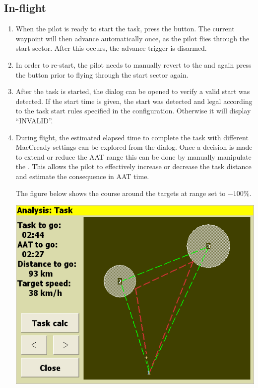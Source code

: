 \documentclass[a4paper,12pt]{refrep}
\begin{document}
\subsection*{In-flight}
\begin{enumerate}
\item  When the pilot is ready to start the task, press the  button.  The current waypoint will then advance automatically
once, as the pilot flies through the start sector.  After this occurs, the advance trigger is disarmed.  
\item  In order to re-start, the pilot needs to manually revert to the
 and again press the  button prior to
flying through the start sector again.
\item  After the task is started, the  dialog can be opened to
verify a valid start was detected. If the start time is given, the start was detected and legal according to 
the task start rules specified in the configuration.  Otherwise it will display ``INVALID''.
\item  During flight, the estimated elapsed time to complete the task with
different MacCready settings can be explored from the  dialog.
Once a decision is made to extend or reduce the AAT range this can be done by
manually manipulate the . This allows the pilot to effectively increase or decrease the task
distance and estimate the consequence in AAT time.

The figure below shows the course around the targets at range set to $-100$\%.
\begin{center}
\includegraphics[angle=0,width=0.8\linewidth,keepaspectratio='true']{figures/aat-short.png}
\end{center}


\end{enumerate}
\end{document}
